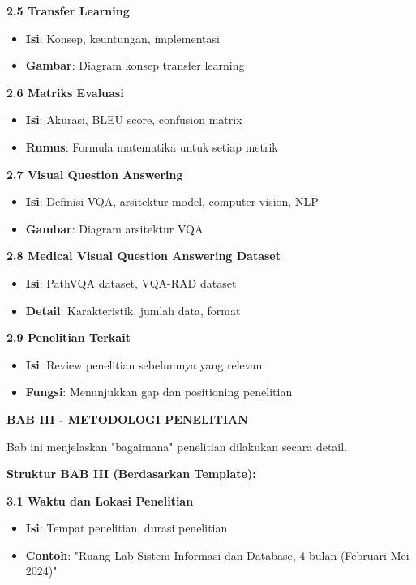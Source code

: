 \textbf{2.5 Transfer Learning}
\begin{itemize}
    \item \textbf{Isi}: Konsep, keuntungan, implementasi
    \item \textbf{Gambar}: Diagram konsep transfer learning
\end{itemize}

\textbf{2.6 Matriks Evaluasi}
\begin{itemize}
    \item \textbf{Isi}: Akurasi, BLEU score, confusion matrix
    \item \textbf{Rumus}: Formula matematika untuk setiap metrik
\end{itemize}

\textbf{2.7 Visual Question Answering}
\begin{itemize}
    \item \textbf{Isi}: Definisi VQA, arsitektur model, computer vision, NLP
    \item \textbf{Gambar}: Diagram arsitektur VQA
\end{itemize}

\textbf{2.8 Medical Visual Question Answering Dataset}
\begin{itemize}
    \item \textbf{Isi}: PathVQA dataset, VQA-RAD dataset
    \item \textbf{Detail}: Karakteristik, jumlah data, format
\end{itemize}

\textbf{2.9 Penelitian Terkait}
\begin{itemize}
    \item \textbf{Isi}: Review penelitian sebelumnya yang relevan
    \item \textbf{Fungsi}: Menunjukkan gap dan positioning penelitian
\end{itemize}

\textbf{BAB III - METODOLOGI PENELITIAN}

Bab ini menjelaskan "bagaimana" penelitian dilakukan secara detail.

\textbf{Struktur BAB III (Berdasarkan Template):}

\textbf{3.1 Waktu dan Lokasi Penelitian}
\begin{itemize}
    \item \textbf{Isi}: Tempat penelitian, durasi penelitian
    \item \textbf{Contoh}: "Ruang Lab Sistem Informasi dan Database, 4 bulan (Februari-Mei 2024)"
\end{itemize}

